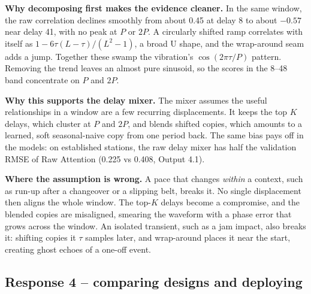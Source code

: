 \textbf{Why decomposing first makes the evidence cleaner.} In the same window, the raw correlation declines smoothly from about 0.45 at delay 8 to about $-0.57$ near delay 41, with no peak at $P$ or $2P$. A circularly shifted ramp correlates with itself as $1-6\tau(L-\tau)/(L^2-1)$, a broad U shape, and the wrap-around seam adds a jump. Together these swamp the vibration's $\cos(2\pi\tau/P)$ pattern. Removing the trend leaves an almost pure sinusoid, so the scores in the 8--48 band concentrate on $P$ and $2P$.

\textbf{Why this supports the delay mixer.} The mixer assumes the useful relationships in a window are a few recurring displacements. It keeps the top $K$ delays, which cluster at $P$ and $2P$, and blends shifted copies, which amounts to a learned, soft seasonal-naive copy from one period back. The same bias pays off in the models: on established stations, the raw delay mixer has half the validation RMSE of Raw Attention (0.225 vs 0.408, Output 4.1).

\textbf{Where the assumption is wrong.} A pace that changes \emph{within} a context, such as run-up after a changeover or a slipping belt, breaks it. No single displacement then aligns the whole window. The top-$K$ delays become a compromise, and the blended copies are misaligned, smearing the waveform with a phase error that grows across the window. An isolated transient, such as a jam impact, also breaks it: shifting copies it $\tau$ samples later, and wrap-around places it near the start, creating ghost echoes of a one-off event.

\subsection*{Response 4 -- comparing designs and deploying}

